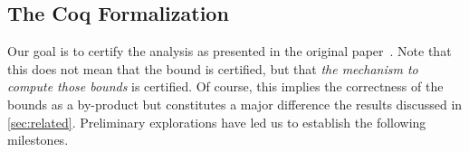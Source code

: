 \documentclass[sigplan,screen,timestamp,%
nonacm]{acmart}
\begin{document}


\subsection{The Coq Formalization}
\label{subsec:action-plan}

Our goal is to certify the analysis as presented in the original paper~\cite{Jones2009}.
Note that this does not mean that the bound is certified, but that \emph{the mechanism to compute those bounds} is certified.
Of course, this implies the correctness of the bounds as a by-product but constitutes a major difference \wrt the results discussed in \autoref{sec:related}.
%
Preliminary explorations have led us to establish the following milestones.
\end{document}
